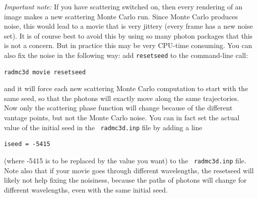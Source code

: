 \documentclass{report}
\begin{document}
{\em Important note:} If you have scattering switched on, then every
rendering of an image makes a new scattering Monte Carlo run. Since Monte
Carlo produces noise, this would lead to a movie that is very jittery
(every frame has a new noise set). It is of course best to avoid this
by using so many photon packages that this is not a concern. But in 
practice this may be very CPU-time consuming. You can also fix the noise
in the following way: add {\small\tt resetseed} to the command-line call:
{\small\begin{verbatim}
radmc3d movie resetseed
\end{verbatim}}
and it will force each new scattering Monte Carlo computation to start
with the same seed, so that the photons will exactly move along the same
trajectories. Now only the scattering phase function will change because
of the different vantage points, but not the Monte Carlo noise. You can 
in fact set the actual value of the initial seed in the {\small\tt
radmc3d.inp} file by adding a line 
{\small\begin{verbatim}
iseed = -5415
\end{verbatim}}
(where -5415 is to be replaced by the value you want) to the {\small\tt
  radmc3d.inp} file. Note also that if your
movie goes through different wavelengths, the resetseed will likely not help
fixing the noisiness, because the paths of photons will change for different
wavelengths, even with the same initial seed.
\end{document}
